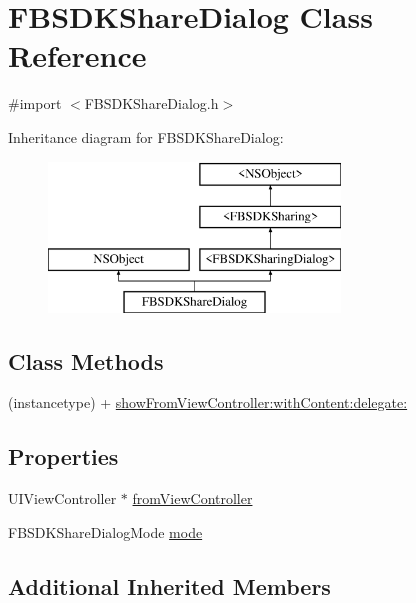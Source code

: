 \hypertarget{interface_f_b_s_d_k_share_dialog}{}\section{F\+B\+S\+D\+K\+Share\+Dialog Class Reference}
\label{interface_f_b_s_d_k_share_dialog}


{\ttfamily \#import $<$F\+B\+S\+D\+K\+Share\+Dialog.\+h$>$}

Inheritance diagram for F\+B\+S\+D\+K\+Share\+Dialog\+:\begin{figure}[H]
\begin{center}
\leavevmode
\includegraphics[height=4.000000cm]{interface_f_b_s_d_k_share_dialog}
\end{center}
\end{figure}
\subsection*{Class Methods}
\begin{DoxyCompactItemize}
\item 
(instancetype) + \hyperlink{interface_f_b_s_d_k_share_dialog_a782dfa1147814c5769cdb7b9d32e058d}{show\+From\+View\+Controller\+:with\+Content\+:delegate\+:}
\end{DoxyCompactItemize}
\subsection*{Properties}
\begin{DoxyCompactItemize}
\item 
U\+I\+View\+Controller $\ast$ \hyperlink{interface_f_b_s_d_k_share_dialog_a1319782aa7ce9db59c35ac6a9bb9a2c9}{from\+View\+Controller}
\item 
F\+B\+S\+D\+K\+Share\+Dialog\+Mode \hyperlink{interface_f_b_s_d_k_share_dialog_a2fa09cba91a90a644c2cd8dd26de372d}{mode}
\end{DoxyCompactItemize}
\subsection*{Additional Inherited Members}


